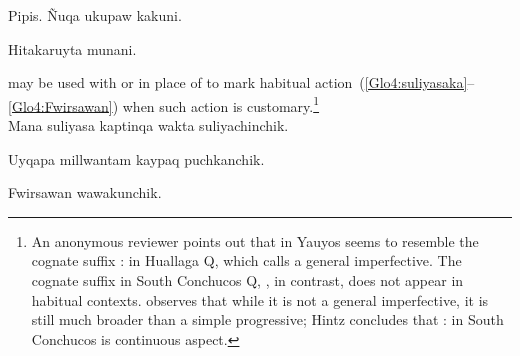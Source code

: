 %
{Pipis. Ñuqa ukupaw kakuni.}%
{}%
{}{}%

%
{Hitakaruyta munani.}%
{}%
{}{}%

\noindent
{} may be used with or in place of  to mark habitual action~(\ref{Glo4:suliyasaka}--\ref{Glo4:Fwirsawan}) when such action is customary.\footnote{An anonymous reviewer points out that  in Yauyos seems to resemble the cognate suffix : in Huallaga Q, which \citet{Weber89} calls a general imperfective. The cognate suffix in South Conchucos Q, , in contrast, does not appear in habitual contexts. \citet{Hintz} observes that while it is not a general imperfective, it is still much broader than a simple progressive; Hintz concludes that : in South Conchucos is continuous aspect.}\\

%
{Mana suliyasa kaptinqa wakta suliyachinchik.}%
{}%
{}{}%

%
{Uyqapa millwantam kaypaq puchkanchik.}%
{}%
{}{}%

%
{Fwirsawan wawakunchik.}%
{}%
{}{}%

